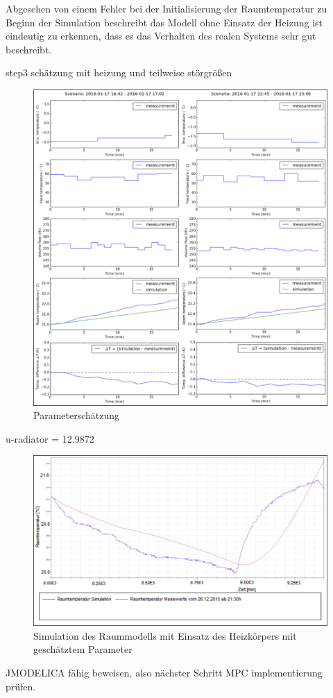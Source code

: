 Abgesehen von einem Fehler bei der Initialisierung der Raumtemperatur zu Beginn der Simulation beschreibt das Modell ohne Einsatz der Heizung ist eindeutig zu erkennen, dass es das Verhalten des realen Systems sehr gut beschreibt.



step3 schätzung mit heizung und teilweise störgrößen

\begin{figure}
\centering
\includegraphics[width=\textwidth]{abbildungen/20160329_pestep3}
\caption{Parameterschätzung}
\label{fig:step3}
\end{figure}




u-radiator = 12.9872


\begin{figure}
\centering
\includegraphics[width=\textwidth]{abbildungen/20160330_validierung2pe}
\caption{Simulation des Raummodells mit Einsatz des Heizkörpers mit geschätztem Parameter}
\label{fig:valid2pe}
\end{figure}

JMODELICA fähig beweisen, also nächster Schritt MPC implementierung prüfen.

